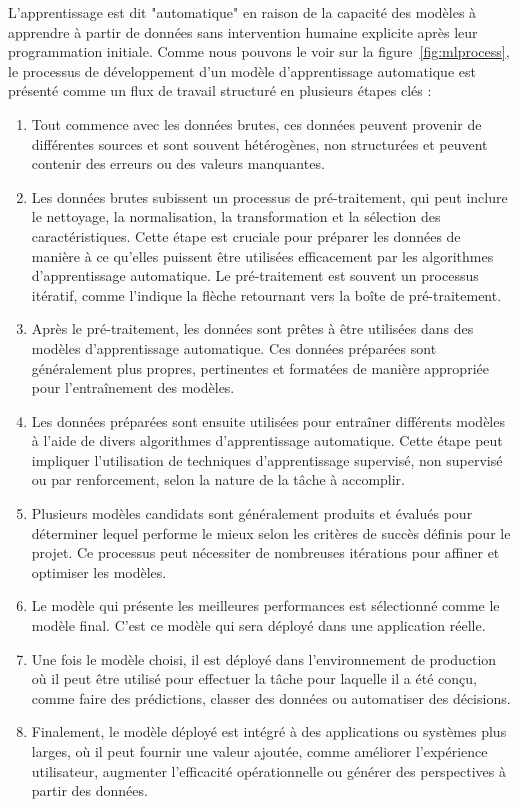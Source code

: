 L'apprentissage est dit "automatique" en raison de la capacité des modèles à apprendre à partir de données sans intervention humaine explicite après leur programmation initiale. Comme nous pouvons le voir sur la figure~\ref{fig:mlprocess}, le processus de développement d'un modèle d'apprentissage automatique est présenté comme un flux de travail structuré en plusieurs étapes clés :

\begin{enumerate}
    \item Tout commence avec les données brutes, ces données peuvent provenir de différentes sources et sont souvent hétérogènes, non structurées et peuvent contenir des erreurs ou des valeurs manquantes.

    \item Les données brutes subissent un processus de pré-traitement, qui peut inclure le nettoyage, la normalisation, la transformation et la sélection des caractéristiques. Cette étape est cruciale pour préparer les données de manière à ce qu'elles puissent être utilisées efficacement par les algorithmes d'apprentissage automatique. Le pré-traitement est souvent un processus itératif, comme l'indique la flèche retournant vers la boîte de pré-traitement.

    \item Après le pré-traitement, les données sont prêtes à être utilisées dans des modèles d'apprentissage automatique. Ces données préparées sont généralement plus propres, pertinentes et formatées de manière appropriée pour l'entraînement des modèles.

    \item Les données préparées sont ensuite utilisées pour entraîner différents modèles à l'aide de divers algorithmes d'apprentissage automatique. Cette étape peut impliquer l'utilisation de techniques d'apprentissage supervisé, non supervisé ou par renforcement, selon la nature de la tâche à accomplir.

    \item Plusieurs modèles candidats sont généralement produits et évalués pour déterminer lequel performe le mieux selon les critères de succès définis pour le projet. Ce processus peut nécessiter de nombreuses itérations pour affiner et optimiser les modèles.

    \item Le modèle qui présente les meilleures performances est sélectionné comme le modèle final. C’est ce modèle qui sera déployé dans une application réelle.

    \item Une fois le modèle choisi, il est déployé dans l'environnement de production où il peut être utilisé pour effectuer la tâche pour laquelle il a été conçu, comme faire des prédictions, classer des données ou automatiser des décisions.

    \item Finalement, le modèle déployé est intégré à des applications ou systèmes plus larges, où il peut fournir une valeur ajoutée, comme améliorer l'expérience utilisateur, augmenter l'efficacité opérationnelle ou générer des perspectives à partir des données.
\end{enumerate}


